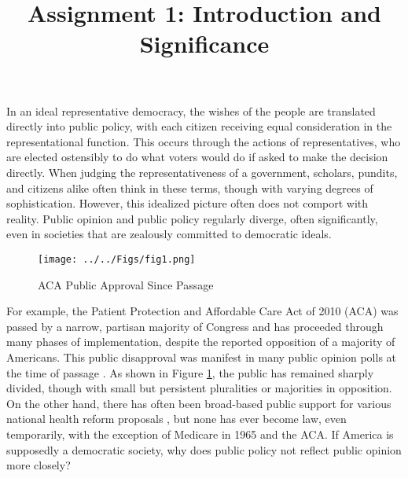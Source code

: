

\title{Assignment 1: Introduction and Significance}



\maketitle

In an ideal representative democracy, the wishes of the people are translated directly into public policy, with each citizen receiving equal consideration in the representational function. This occurs through the actions of representatives, who are elected ostensibly to do what voters would do if asked to make the decision directly. When judging the representativeness of a government, scholars, pundits, and citizens alike often think in these terms, though with varying degrees of sophistication. However, this idealized picture often does not comport with reality. Public opinion and public policy regularly diverge, often significantly, even in societies that are zealously committed to democratic ideals.

\begin{figure}[bt]
	\caption{ACA Public Approval Since Passage}
	\texttt{[image: ../../Figs/fig1.png]}
	\label{fig:1}
\end{figure}

For example, the Patient Protection and Affordable Care Act of 2010 (ACA) was passed by a narrow, partisan majority of Congress and has proceeded through many phases of implementation, despite the reported opposition of a majority of Americans. This public disapproval was manifest in many public opinion polls at the time of passage \citep{Blendon2010b}. As shown in Figure \ref{fig:1}, the public has remained sharply divided, though with small but persistent pluralities or majorities in opposition. On the other hand, there has often been broad-based public support for various national health reform proposals \citep{Starr1982, Starr2011}, but none has ever become law, even temporarily, with the exception of Medicare in 1965 and the ACA. If America is supposedly a democratic society, why does public policy not reflect public opinion more closely?

